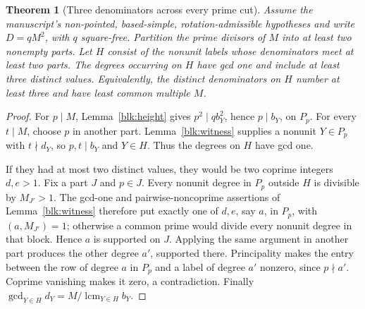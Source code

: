 \documentclass[11pt]{amsart}
\numberwithin{equation}{section}
\newtheorem{theorem}{Theorem}[section]
\theoremstyle{definition}
\theoremstyle{plain}
\DeclareMathOperator{\lcm}{lcm}
\begin{document}
\begin{theorem}[Three denominators across every prime cut]
\label{new:prime-cut}
Assume the manuscript's non-pointed, based-simple,
rotation-admissible hypotheses and write $D=qM^2$, with $q$
square-free. Partition the prime divisors of $M$ into at least
two nonempty parts. Let $H$ consist of the nonunit labels whose
denominators meet at least two parts.
The degrees occurring on $H$ have gcd one and include at least
three distinct values. Equivalently, the distinct denominators
on $H$ number at least three and have least common multiple $M$.
\end{theorem}
\begin{proof}
For $p\mid M$, Lemma~\ref{blk:height} gives $p^2\mid qb_Y^2$,
hence $p\mid b_Y$, on $P_p$. For every $t\mid M$, choose $p$ in
another part. Lemma~\ref{blk:witness} supplies a nonunit $Y\in P_p$
with $t\nmid d_Y$, so $p,t\mid b_Y$ and $Y\in H$.
Thus the degrees on $H$ have gcd one.

If they had at most two distinct values, they would be two coprime
integers $d,e>1$. Fix a part $J$ and $p\in J$. Every nonunit
degree in $P_p$ outside $H$ is divisible by $M_{J'}>1$.
The gcd-one and pairwise-noncoprime assertions of
Lemma~\ref{blk:witness} therefore put exactly one of $d,e$, say $a$,
in $P_p$, with $(a,M_{J'})=1$; otherwise a common prime would
divide every nonunit degree in that block. Hence $a$ is supported
on $J$. Applying the same argument in another part produces the
other degree $a'$, supported there. Principality makes the entry
between the row of degree $a$ in $P_p$ and a label of degree $a'$
nonzero, since $p\nmid a'$. Coprime vanishing makes it zero,
a contradiction. Finally
$\gcd_{Y\in H}d_Y=M/\lcm_{Y\in H}b_Y$.
\end{proof}
\end{document}
